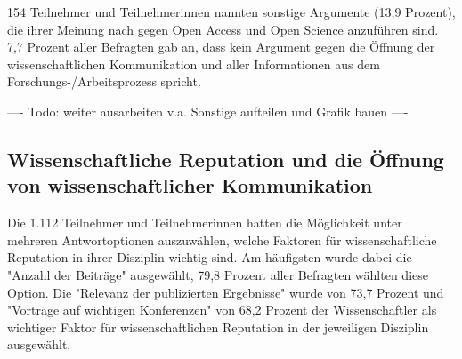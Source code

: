 154 Teilnehmer und Teilnehmerinnen nannten sonstige Argumente (13,9 Prozent), die ihrer Meinung nach gegen Open Access und Open Science anzuführen sind. 7,7 Prozent aller Befragten gab an, dass kein Argument gegen die Öffnung der wissenschaftlichen Kommunikation und aller Informationen aus dem Forschungs-/Arbeitsprozess spricht.

---- Todo: weiter ausarbeiten v.a. Sonstige aufteilen und Grafik bauen ----

\subsection{Wissenschaftliche Reputation und die Öffnung von wissenschaftlicher Kommunikation}

Die 1.112 Teilnehmer und Teilnehmerinnen hatten die Möglichkeit unter mehreren Antwortoptionen auszuwählen, welche Faktoren für wissenschaftliche Reputation in ihrer Disziplin wichtig sind. Am häufigsten wurde dabei die "Anzahl der Beiträge" ausgewählt, 79,8 Prozent aller Befragten wählten diese Option. Die "Relevanz der publizierten Ergebnisse" wurde von 73,7 Prozent und "Vorträge auf wichtigen Konferenzen" von 68,2 Prozent der Wissenschaftler als wichtiger Faktor für wissenschaftlichen Reputation in der jeweiligen Disziplin ausgewählt.

